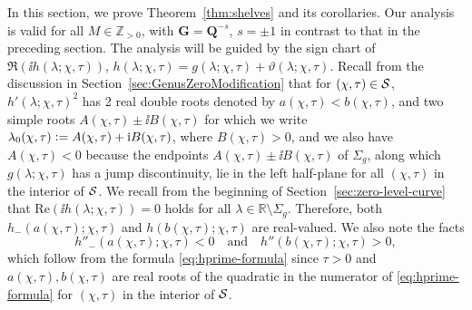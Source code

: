 In this section, we prove Theorem~\ref{thm:shelves} and its corollaries. 
Our analysis is valid for all $M\in \mathbb{Z}_{>0}$, with $\mathbf{G}=\mathbf{Q}^{-s}$, $s=\pm 1$ in contrast to that in the preceding section. The analysis will be guided by the sign chart of $\Re(\ii h(\lambda;\chi,\tau))$, $h(\lambda;\chi,\tau) = g(\lambda;\chi,\tau) +  \vartheta(\lambda;\chi,\tau)$.
Recall from the discussion in Section~\ref{sec:GenusZeroModification} that for $(\chi,\tau)\in\mathcal{S}$, $h'(\lambda;\chi,\tau)^2$ has 2 real double roots denoted by $a(\chi,\tau)<b(\chi,\tau)$, and two simple roots $A(\chi,\tau)\pm \ii B(\chi,\tau)$ for which we write $\lambda_0(\chi,\tau)\vcentcolon=  A(\chi,\tau) + \mathrm{i} B(\chi,\tau)$, where $B(\chi,\tau)>0$, and we also have $A(\chi,\tau)<0$ because the endpoints $A(\chi,\tau) \pm \ii B(\chi,\tau)$ of $\Sigma_g$, along which $g(\lambda;\chi,\tau)$ has a jump discontinuity, lie in the left half-plane for all $(\chi,\tau)$ in the interior of $\mathcal{S}$. We recall from the beginning of Section~\ref{sec:zero-level-curve} that $\mathrm{Re}(\ii h(\lambda;\chi,\tau))=0$ holds for all $\lambda\in\mathbb{R} \setminus \Sigma_g$. Therefore, both $h_{-}(a(\chi,\tau);\chi,\tau)$ and $h(b(\chi,\tau);\chi,\tau)$ are real-valued. 
We also note the facts
\begin{equation}
h''_-(a(\chi,\tau);\chi,\tau) < 0 \quad\text{and}\quad h''(b(\chi,\tau);\chi,\tau) > 0,
\label{eq:h-double-prime-a-b-signs}
\end{equation}
which follow from the formula \eqref{eq:hprime-formula} since $\tau>0$ and $a(\chi,\tau),b(\chi,\tau)$ are real roots of the quadratic in the numerator of \eqref{eq:hprime-formula} for $(\chi,\tau)$ in the interior of $\mathcal{S}$.



